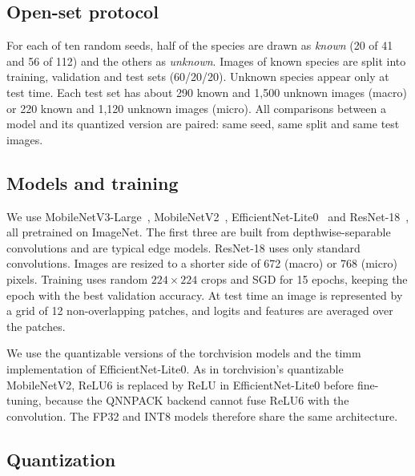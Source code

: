 \documentclass[conference]{IEEEtran}
\begin{document}
\subsection{Open-set protocol}

For each of ten random seeds, half of the species are drawn as \emph{known} (20 of 41 and 56 of 112) and the others as \emph{unknown}. Images of known species are split into training, validation and test sets (60/20/20). Unknown species appear only at test time. Each test set has about 290 known and 1,500 unknown images (macro) or 220 known and 1,120 unknown images (micro). All comparisons between a model and its quantized version are paired: same seed, same split and same test images.

\subsection{Models and training}

We use MobileNetV3-Large~\cite{howard2019searching}, MobileNetV2~\cite{sandler2018mobilenetv2}, EfficientNet-Lite0~\cite{tan2019efficientnet} and ResNet-18~\cite{he2016deep}, all pretrained on ImageNet. The first three are built from depthwise-separable convolutions and are typical edge models. ResNet-18 uses only standard convolutions. Images are resized to a shorter side of 672 (macro) or 768 (micro) pixels. Training uses random $224\times 224$ crops and SGD for 15 epochs, keeping the epoch with the best validation accuracy. At test time an image is represented by a grid of 12 non-overlapping patches, and logits and features are averaged over the patches.

We use the quantizable versions of the torchvision models and the timm~\cite{wightman2019timm} implementation of EfficientNet-Lite0. As in torchvision's quantizable MobileNetV2, ReLU6 is replaced by ReLU in EfficientNet-Lite0 before fine-tuning, because the QNNPACK backend cannot fuse ReLU6 with the convolution. The FP32 and INT8 models therefore share the same architecture.

\subsection{Quantization}
\end{document}
